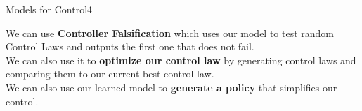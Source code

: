 \begin{questions}
\begin{question}[bonus]{Models for Control}{4}
\begin{answer}
We can use \textbf{Controller Falsification} which uses our model to test random Control Laws and outputs the first one that does not fail.\\
We can also use it to \textbf{optimize our control law} by generating control laws and comparing them to our current best control law. \\
We can also use our learned model to \textbf{generate a policy} that simplifies our control.
\end{answer}

\end{question}


\end{questions}
